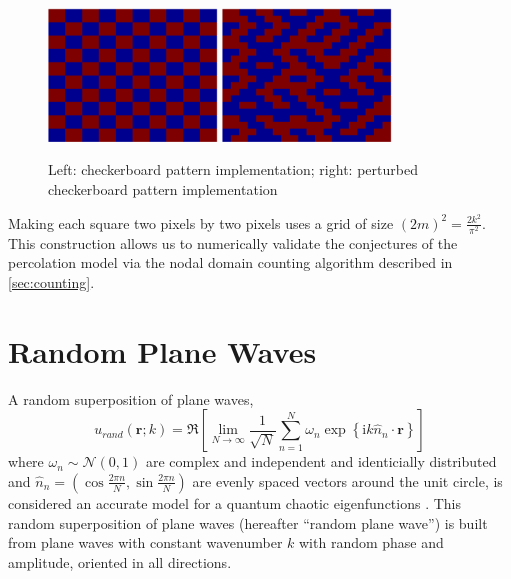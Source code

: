 \documentclass{report}
\newcommand{\rr}[0]{\mathbf{r}}
\begin{document}
\begin{figure}
  \begin{center}
    \includegraphics[width=0.4\textwidth]{figs/percolation/checkerboard_implementation.eps}
    \hspace{1 cm}
    \includegraphics[width=0.4\textwidth]{figs/percolation/perturbed_implementation.eps}
    \caption{Left: checkerboard pattern implementation; right: perturbed checkerboard pattern implementation}
    \label{fig:percolation_implementation}
  \end{center}
\end{figure}

Making each square two pixels by two pixels uses a grid of size $(2m)^{2} = \frac{2 k^{2}}{\pi^2}$. This construction allows us to numerically validate the conjectures of the percolation model via the nodal domain counting algorithm described in \ref{sec:counting}.

\section{Random Plane Waves}
A random superposition of plane waves,
\begin{equation}
  \label{eq:rpw}
  u_{rand}(\rr ; k) = \Re \left[ \lim_{N \rightarrow \infty} \frac{1}{\sqrt{N}} \sum_{n=1}^{N} \omega_{n} \exp{\left\{\mathrm{i} k \hat{n}_{n} \cdot \rr \right\}} \right]
\end{equation}
where $\omega_{n} \sim \mathcal{N}(0,1)$ are complex and independent and identicially distributed and $\hat{n}_{n} = (\cos \frac {2 \pi n}{N}, \sin \frac {2 \pi n}{N})$ are evenly spaced vectors around the unit circle, is considered an accurate model for a quantum chaotic eigenfunctions \cite{heller}. This random superposition of plane waves (hereafter ``random plane wave'') is built from plane waves with constant wavenumber $k$ with random phase and amplitude, oriented in all directions.
\end{document}
